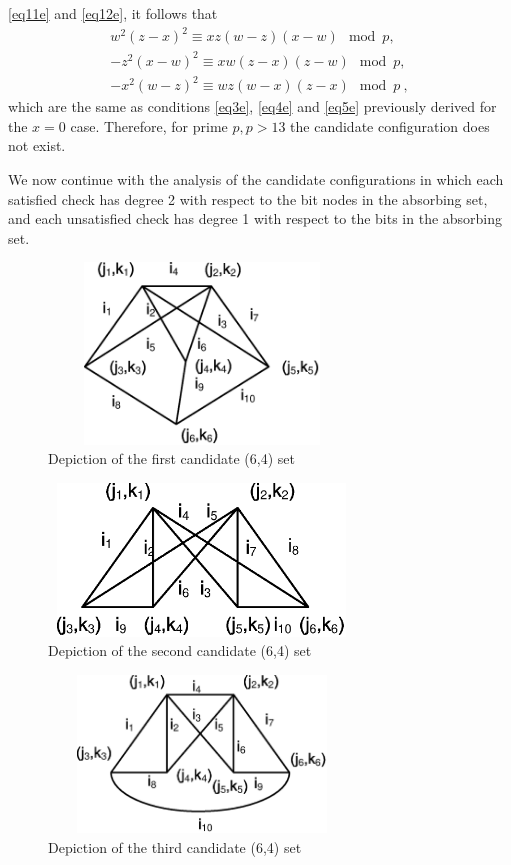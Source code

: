 \eqref{eq11e} and \eqref{eq12e}, it follows that
\begin{equation}
\begin{array}{ccc}
w^2(z-x)^2 \equiv xz(w-z)(x-w) \mod p,\\
-z^2(x-w)^2 \equiv xw(z-x)(z-w) \mod p,\\
-x^2(w-z)^2 \equiv wz(w-x)(z-x) \mod p~,
\end{array}\end{equation}
which are the same as conditions \eqref{eq3e}, \eqref{eq4e} and
\eqref{eq5e} previously derived for the $x=0$ case. Therefore, for
prime $p, p>13$ the candidate configuration does not exist.

We now continue with the analysis of the candidate configurations in
which each satisfied check has degree 2 with respect to the bit
nodes in the absorbing set, and each unsatisfied check has degree 1
with respect to the bits in the absorbing set.
\begin{figure}[ht]
\center\includegraphics[width=3.2in,height=1.9in]{Drawing641_1.eps}
\caption{Depiction of the first candidate (6,4) set}\label{fig64a}
\end{figure}
\begin{figure}\center
\includegraphics[width=3.2in,height=1.6in]{Drawing643_1.eps}
\caption{Depiction of the second candidate (6,4) set}\label{fig64b}
\end{figure}
\begin{figure}
\center\includegraphics[width=3.2in,height=1.65in]{Drawing642_2.eps}
\caption{Depiction of the third candidate (6,4) set} \label{fig64c}
\end{figure}

